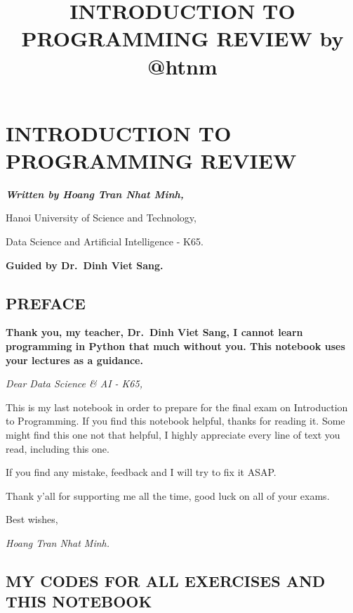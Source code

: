 \documentclass[11pt]{article}
\title{INTRODUCTION TO PROGRAMMING REVIEW by @htnm}
\begin{document}
    
    \maketitle
    \tableofcontents
    

    
    \hypertarget{introduction-to-programming-review}{%
\section{\texorpdfstring{\textbf{INTRODUCTION TO PROGRAMMING
REVIEW}}{INTRODUCTION TO PROGRAMMING REVIEW}}\label{introduction-to-programming-review}}

\textbf{\emph{Written by Hoang Tran Nhat Minh,}}

Hanoi University of Science and Technology,

Data Science and Artificial Intelligence - K65.

\textbf{Guided by Dr.~Dinh Viet Sang.}

    \hypertarget{preface}{%
\subsection{PREFACE}\label{preface}}

    \textbf{Thank you, my teacher, Dr.~Dinh Viet Sang, I cannot learn
programming in Python that much without you. This notebook uses your
lectures as a guidance.}

\emph{Dear Data Science \& AI - K65,}

This is my last notebook in order to prepare for the final exam on
Introduction to Programming. If you find this notebook helpful, thanks
for reading it. Some might find this one not that helpful, I highly
appreciate every line of text you read, including this one.

If you find any mistake, feedback and I will try to fix it ASAP.

Thank y'all for supporting me all the time, good luck on all of your
exams.

Best wishes,

\emph{Hoang Tran Nhat Minh.}

    \hypertarget{my-codes-for-all-exercises-and-this-notebook}{%
\subsection{MY CODES FOR ALL EXERCISES AND THIS
NOTEBOOK}\label{my-codes-for-all-exercises-and-this-notebook}}
\end{document}
